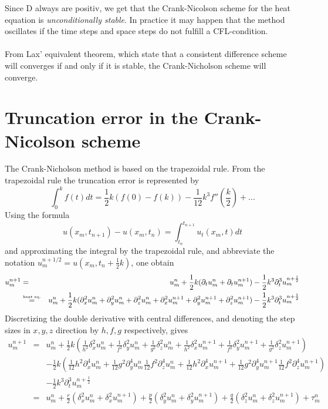 Since D always are positiv, we get that the Crank-Nicolson
scheme for the heat equation is \emph{unconditionally stable}. In practice it may happen that the method oscillates if the time steps and space steps do not fulfill a CFL-condition.
\\
\\
From Lax' equivalent theorem, which state that a consistent difference scheme will converges if and only if it is stable, the Crank-Nicholson scheme will converge.


\section{Truncation error in the Crank-Nicolson scheme}

The Crank-Nicholson method is based on the trapezoidal rule. From the trapezoidal rule the truncation error is represented by
\begin{equation*}
\int_0^k f(t) dt = \frac{1}{2} k (f(0) - f(k)) -\frac{1}{12} k^3 f''(\frac{k}{2}) + ...
\end{equation*}
Using the formula
\begin{equation*}
	u(x_m,t_{n+1}) - u(x_m,t_n) = \int_{t_n} ^{t_{n+1}} u_t(x_m,t) dt
\end{equation*}
and approximating the integral by the trapezoidal rule, and abbreviate the notation $u_m^{n+1/2} = u(x_m,t_n+\frac{1}{2} k)$, one obtain
\begin{eqnarray*}
u_m^ {n+1} &=& u_m^ n + \frac{1}{2} k(\partial_t u_m^n + \partial_t u_m^{n+1}) - \frac{1}{2} k^3 \partial_t ^3 u_m^{n+\frac{1}{2}} \\
		   &\stackrel{\text{\tiny heat eq.}}{=}&  u_m^ n + \frac{1}{2} k(\partial_x^2 u_m^n + \partial_y^2 u_m^n + \partial_z^2 u_m^n + \partial_x^2 u_m^{n+1} + \partial_y^2 u_m^{n+1} + \partial_z^2 u_m^{n+1}) - \frac{1}{2} k^3 \partial_t ^3 u_m^{n+\frac{1}{2}}
\end{eqnarray*}
Discretizing the double derivative with central differences, and denoting the step sizes in $x, y, z$ direction by $h, f, g$ respectively, gives
\begin{eqnarray*}
u_m^{n+1} &=&  u_m^ n + \frac{1}{2} k(\frac{1}{h^2}\delta_x^2 u_m^n + \frac{1}{f^2}\delta_y^2 u_m^n + \frac{1}{g^2}\delta_z^2 u_m^n + \frac{1}{h^2}\delta_x^2 u_m^{n+1} + \frac{1}{f^2}\delta_y^2 u_m^{n+1} + \frac{1}{g^2}\delta_z^2 u_m^{n+1}) \\
 		  &&- \frac{1}{2} k (\frac{1}{12}h^2\partial_x^4 u_m^n + \frac{1}{12}g^2\partial_y^4 u_m^n \frac{1}{12}f^2\partial_z^4 u_m^n + \frac{1}{12}h^2\partial_x^4 u_m^{n+1} + \frac{1}{12}g^2\partial_y^4 u_m^{n+1} \frac{1}{12}f^2\partial_z^4 u_m^{n+1} ) \\
 		  &&- \frac{1}{2} k^3 \partial_t ^3 u_m^{n+\frac{1}{2}} \\
 		  &=& u_m^n + \frac{r}{2}(\delta_x^2 u_m^n + \delta_x^2 u_m^{n+1}) + \frac{p}{2}(\delta_y^2 u_m^n + \delta_y^2 u_m^{n+1}) + \frac{q}{2}(\delta_z^2 u_m^n + \delta_z^2 u_m^{n+1}) + \tau_m^n
\end{eqnarray*}
